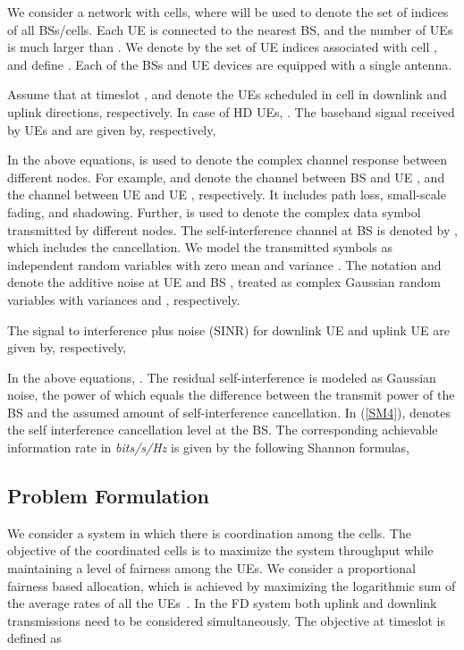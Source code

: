 \documentclass[journal]{IEEEtran}
\begin{document}
We consider a network with  cells, where  will be used to denote the set of indices of all BSs/cells. Each UE is connected to the nearest BS, and the number of UEs is much larger than . We denote by  the set of UE indices associated with cell , and define . Each of the BSs and UE devices are equipped with a single antenna. 

Assume that at timeslot ,  and  denote the UEs scheduled in cell  in downlink and uplink directions, respectively. In case of HD UEs, . The baseband signal received by UEs  and  are given by, respectively, 




In the above equations,  is used to denote the complex channel response between different nodes. For example,  and  denote the channel between BS  and UE , and the channel between UE  and UE , respectively. It includes path loss, small-scale fading, and shadowing. Further,  is used to denote the complex data symbol transmitted by different nodes. The self-interference channel at BS  is denoted by , which includes the cancellation. We model the transmitted symbols as independent random variables with zero mean and variance . The notation  and  denote the additive noise at UE  and BS , treated as complex Gaussian random variables with variances  and , respectively. 

The signal to interference plus noise (SINR) for downlink UE  and uplink UE  are given by, respectively, 



In the above equations, . The residual self-interference is modeled as Gaussian noise, the power of which equals the difference between the transmit power of the BS and the assumed amount of self-interference cancellation. In (\ref{SM4}),  denotes the self interference cancellation level at the BS. The corresponding achievable information rate in \textit{bits/s/Hz} is given by the following Shannon formulas, 



\subsection{Problem Formulation}\label{subsec:SMPFS2}
We consider a system in which there is coordination among the cells. The objective of the coordinated cells is to maximize the system throughput while maintaining a level of fairness among the UEs. We consider a proportional fairness based allocation, which is achieved by maximizing the logarithmic sum of the average rates of all the UEs~\cite{Stoylar05}\cite{PF_proof}. In the FD system both uplink and downlink transmissions need to be considered simultaneously. The objective at timeslot  is defined as
 
\end{document}
